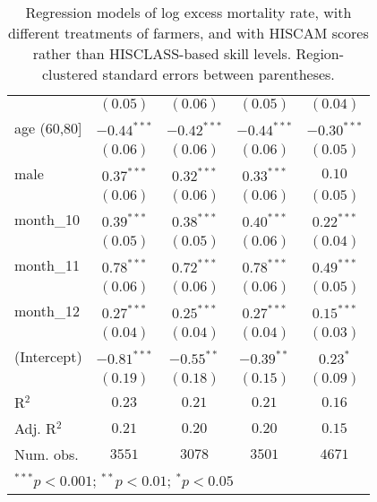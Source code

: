 \begin{table}
\begin{center}
\begin{tabular}{l c c c c}
               & $(0.05)$      & $(0.06)$      & $(0.05)$      & $(0.04)$      \\
age (60,80]    & $-0.44^{***}$ & $-0.42^{***}$ & $-0.44^{***}$ & $-0.30^{***}$ \\
               & $(0.06)$      & $(0.06)$      & $(0.06)$      & $(0.05)$      \\
male           & $0.37^{***}$  & $0.32^{***}$  & $0.33^{***}$  & $0.10$        \\
               & $(0.06)$      & $(0.06)$      & $(0.06)$      & $(0.05)$      \\
month\_10      & $0.39^{***}$  & $0.38^{***}$  & $0.40^{***}$  & $0.22^{***}$  \\
               & $(0.05)$      & $(0.05)$      & $(0.06)$      & $(0.04)$      \\
month\_11      & $0.78^{***}$  & $0.72^{***}$  & $0.78^{***}$  & $0.49^{***}$  \\
               & $(0.06)$      & $(0.06)$      & $(0.06)$      & $(0.05)$      \\
month\_12      & $0.27^{***}$  & $0.25^{***}$  & $0.27^{***}$  & $0.15^{***}$  \\
               & $(0.04)$      & $(0.04)$      & $(0.04)$      & $(0.03)$      \\
(Intercept)    & $-0.81^{***}$ & $-0.55^{**}$  & $-0.39^{**}$  & $0.23^{*}$    \\
               & $(0.19)$      & $(0.18)$      & $(0.15)$      & $(0.09)$      \\
\hline
R$^2$          & $0.23$        & $0.21$        & $0.21$        & $0.16$        \\
Adj. R$^2$     & $0.21$        & $0.20$        & $0.20$        & $0.15$        \\
Num. obs.      & $3551$        & $3078$        & $3501$        & $4671$        \\
\hline
\multicolumn{5}{l}{\scriptsize{$^{***}p<0.001$; $^{**}p<0.01$; $^{*}p<0.05$}}
\end{tabular}
\caption{Regression models of log excess mortality rate, with different treatments of farmers, and with HISCAM scores rather than HISCLASS-based skill levels. Region-clustered standard errors between parentheses.}
\label{tab:altoccmodels}
\end{center}
\end{table}
